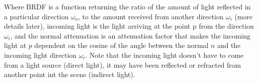 Where BRDF is a function returning the ratio of the amount of light reflected in a particular direction $\omega_o$, to the
amount received from another direction $\omega_i$ (more details later), incoming light is the light arriving at the point p
from the direction $\omega_i$, and the normal attenuation is an attenuation factor that makes the incoming light at $p$
dependent on the cosine of the angle between the normal $n$ and the incoming light direction $\omega_i$. Note that the
incoming light doesn't have to come from a light source (direct light), it may have been reflected or refracted from another
point int the scene (indirect light).
